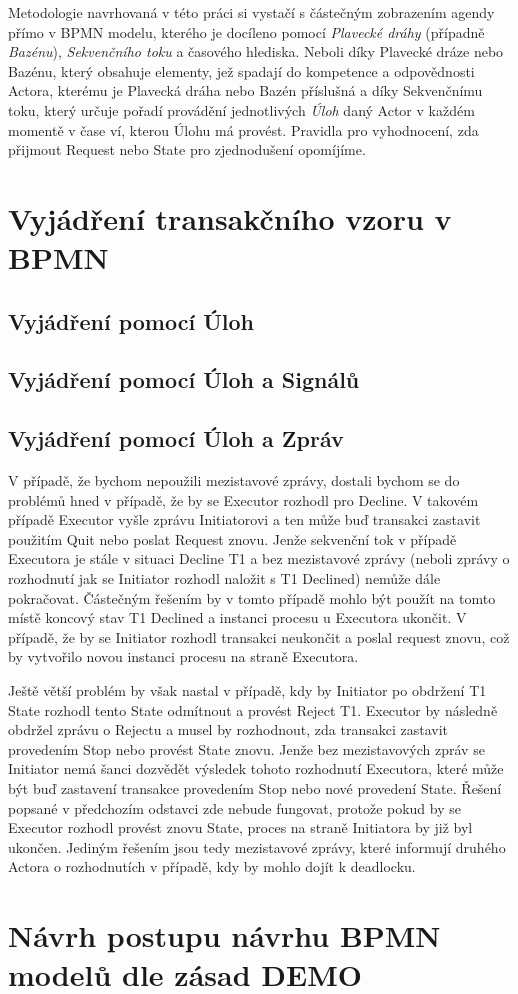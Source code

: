 \documentclass[]{article}
\begin{document}
Metodologie navrhovaná v této práci si vystačí s částečným zobrazením agendy přímo v BPMN modelu, kterého je docíleno pomocí \textit{Plavecké dráhy} (případně \textit{Bazénu}), \textit{Sekvenčního toku} a časového hlediska. Neboli díky Plavecké dráze nebo Bazénu, který obsahuje elementy, jež spadají do kompetence a odpovědnosti Actora, kterému je Plavecká dráha nebo Bazén příslušná a díky Sekvenčnímu toku, který určuje pořadí provádění jednotlivých \textit{Úloh} daný Actor v každém momentě v čase ví, kterou Úlohu má provést. Pravidla pro vyhodnocení, zda přijmout Request nebo State pro zjednodušení opomíjíme.

\section{Vyjádření transakčního vzoru v BPMN}
\subsection{Vyjádření pomocí Úloh}
\subsection{Vyjádření pomocí Úloh a Signálů}
\subsection{Vyjádření pomocí Úloh a Zpráv}
V případě, že bychom nepoužili mezistavové zprávy, dostali bychom se do problémů hned v případě, že by se Executor rozhodl pro Decline. V takovém případě Executor vyšle zprávu Initiatorovi a ten může buď transakci zastavit použitím Quit nebo poslat Request znovu. Jenže sekvenční tok v případě Executora je stále v situaci Decline T1 a bez mezistavové zprávy (neboli zprávy o rozhodnutí jak se Initiator rozhodl naložit s T1 Declined) nemůže dále pokračovat. Částečným řešením by v tomto případě mohlo být použít na tomto místě koncový stav T1 Declined a instanci procesu u Executora ukončit. V případě, že by se Initiator rozhodl transakci neukončit a poslal request znovu, což by vytvořilo novou instanci procesu na straně Executora.

Ještě větší problém by však nastal v případě, kdy by Initiator po obdržení T1 State rozhodl tento State odmítnout a provést Reject T1. Executor by následně obdržel zprávu o Rejectu a musel by rozhodnout, zda transakci zastavit provedením Stop nebo provést State znovu. Jenže bez mezistavových zpráv se Initiator nemá šanci dozvědět výsledek tohoto rozhodnutí Executora, které může být buď zastavení transakce provedením Stop nebo nové provedení State. Řešení popsané v předchozím odstavci zde nebude fungovat, protože pokud by se Executor rozhodl provést znovu State, proces na straně Initiatora by již byl ukončen. Jediným řešením jsou tedy mezistavové zprávy, které informují druhého Actora o rozhodnutích v případě, kdy by mohlo dojít k deadlocku.

\section{Návrh postupu návrhu BPMN modelů dle zásad DEMO}

\nocite{*}


\end{document}
